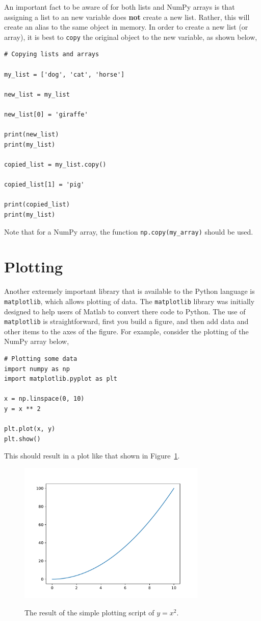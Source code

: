 \documentclass[a4paper]{article}
\begin{document}
An important fact to be aware of for both lists and NumPy arrays is that assigning a list to an new variable does \textbf{not} create a new list.
Rather, this will create an alias to the same object in memory.
In order to create a new list (or array), it is best to \texttt{copy} the original object to the new variable, as shown below,
\begin{lstlisting}
# Copying lists and arrays

my_list = ['dog', 'cat', 'horse']

new_list = my_list

new_list[0] = 'giraffe'

print(new_list)
print(my_list)

copied_list = my_list.copy()

copied_list[1] = 'pig'

print(copied_list)
print(my_list)
\end{lstlisting}
Note that for a NumPy array, the function \texttt{np.copy(my\_array)} should be used.

\section{Plotting}

Another extremely important library that is available to the Python language is \texttt{matplotlib}, which allows plotting of data.
The \texttt{matplotlib} library was initially designed to help users of Matlab to convert there code to Python.
The use of \texttt{matplotlib} is straightforward, first you build a figure, and then add data and other items to the axes of the figure.
For example, consider the plotting of the NumPy array below,
\begin{lstlisting}
# Plotting some data
import numpy as np
import matplotlib.pyplot as plt

x = np.linspace(0, 10)
y = x ** 2

plt.plot(x, y)
plt.show()
\end{lstlisting}
This should result in a plot like that shown in Figure~\ref{fig:x2}.
%
\begin{figure}[t]
\centering
\includegraphics[width=0.8\textwidth]{x_squared}
\label{fig:x2}
\caption{The result of the simple plotting script of $y = x ^ 2$.}
\end{figure}
%
\end{document}
